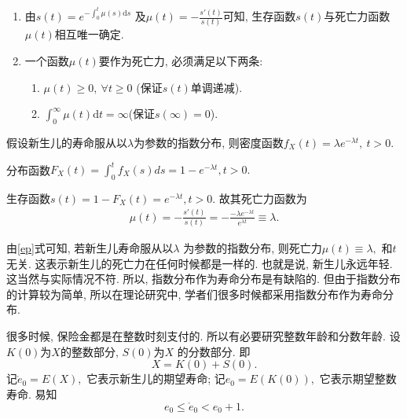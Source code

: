 \documentclass[lang=cn,10pt]{elegantbook}
\begin{document}
\begin{remark}
    \begin{enumerate}
        \item 由$s(t) = e^{-\int_{0}^{t}\mu(s)\mathrm{d}s}$ 及$ \mu(t) = -\frac{s'(t)}{s(t)}$可知, 生存函数$s(t)$与死亡力函数$\mu(t)$相互唯一确定.
        \item 一个函数$\mu(t)$要作为死亡力, 必须满足以下两条:
              \begin{enumerate}
                  \item $\mu(t) \geq 0, ~\forall t \geq 0$ (保证$s(t)$单调递减).
                  \item $\int_0^{\infty}\mu(t)\mathrm{d}t = \infty$(保证$s(\infty)=0$).
              \end{enumerate}
    \end{enumerate}
\end{remark}

\begin{example}
    假设新生儿的寿命服从以$\lambda$为参数的指数分布, 则密度函数$f_X(t)=\lambda e^{-\lambda t},~t>0.$
\end{example}
\begin{solution}
    分布函数$F_X(t)=\int_0^t f_X(s)ds=1-e^{-\lambda t}, t>0.$

    生存函数$s(t)=1-F_X(t)=e^{-\lambda t},t>0.$  故其死亡力函数为
    \begin{align}\label{ep}
        \mu(t)=-\frac{s'(t)}{s(t)}=-\frac{-\lambda e^{-\lambda t}}{e^{\lambda t}}\equiv\lambda.
    \end{align}
\end{solution}

\begin{remark}
    由\eqref{ep}式可知, 若新生儿寿命服从以$\lambda$ 为参数的指数分布, 则死亡力$\mu(t)\equiv \lambda,$ 和$t$ 无关. 这表示新生儿的死亡力在任何时候都是一样的. 也就是说, 新生儿永远年轻. 这当然与实际情况不符. 所以, 指数分布作为寿命分布是有缺陷的. 但由于指数分布的计算较为简单, 所以在理论研究中, 学者们很多时候都采用指数分布作为寿命分布.
\end{remark}

\begin{definition}[整数年龄与分数年龄]
    很多时候, 保险金都是在整数时刻支付的. 所以有必要研究整数年龄和分数年龄. 设$K(0)$为$X$的整数部分, $S(0)$为$X$ 的分数部分. 即
    $$X = K(0) + S(0).$$
    记$\mathring{e}_0 = E(X),$ 它表示新生儿的期望寿命; 记$e_0 = E(K(0)),$ 它表示期望整数寿命. 易知
    \begin{equation*}
        e_0 \le \mathring{e}_0 < e_0 + 1.
    \end{equation*}
\end{definition}
\end{document}
